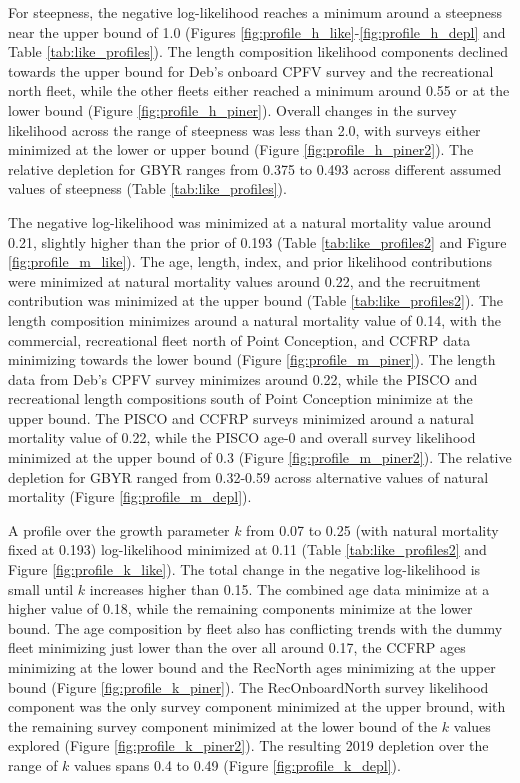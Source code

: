 \documentclass[12pt,]{article}
\begin{document}
For steepness, the negative log-likelihood reaches a minimum around a
steepness near the upper bound of 1.0 (Figures
\ref{fig:profile_h_like}-\ref{fig:profile_h_depl} and Table
\ref{tab:like_profiles}). The length composition likelihood components
declined towards the upper bound for Deb's onboard CPFV survey and the
recreational north fleet, while the other fleets either reached a
minimum around 0.55 or at the lower bound (Figure
\ref{fig:profile_h_piner}). Overall changes in the survey likelihood
across the range of steepness was less than 2.0, with surveys either
minimized at the lower or upper bound (Figure
\ref{fig:profile_h_piner2}). The relative depletion for GBYR ranges from
0.375 to 0.493 across different assumed values of steepness (Table
\ref{tab:like_profiles}).

The negative log-likelihood was minimized at a natural mortality value
around 0.21, slightly higher than the prior of 0.193 (Table
\ref{tab:like_profiles2} and Figure \ref{fig:profile_m_like}). The age,
length, index, and prior likelihood contributions were minimized at
natural mortality values around 0.22, and the recruitment contribution
was minimized at the upper bound (Table \ref{tab:like_profiles2}). The
length composition minimizes around a natural mortality value of 0.14,
with the commercial, recreational fleet north of Point Conception, and
CCFRP data minimizing towards the lower bound (Figure
\ref{fig:profile_m_piner}). The length data from Deb's CPFV survey
minimizes around 0.22, while the PISCO and recreational length
compositions south of Point Conception minimize at the upper bound. The
PISCO and CCFRP surveys minimized around a natural mortality value of
0.22, while the PISCO age-0 and overall survey likelihood minimized at
the upper bound of 0.3 (Figure \ref{fig:profile_m_piner2}). The relative
depletion for GBYR ranged from 0.32-0.59 across alternative values of
natural mortality (Figure \ref{fig:profile_m_depl}).

A profile over the growth parameter \(k\) from 0.07 to 0.25 (with
natural mortality fixed at 0.193) log-likelihood minimized at 0.11
(Table \ref{tab:like_profiles2} and Figure \ref{fig:profile_k_like}).
The total change in the negative log-likelihood is small until \(k\)
increases higher than 0.15. The combined age data minimize at a higher
value of 0.18, while the remaining components minimize at the lower
bound. The age composition by fleet also has conflicting trends with the
dummy fleet minimizing just lower than the over all around 0.17, the
CCFRP ages minimizing at the lower bound and the RecNorth ages
minimizing at the upper bound (Figure \ref{fig:profile_k_piner}). The
RecOnboardNorth survey likelihood component was the only survey
component minimized at the upper bround, with the remaining survey
component minimized at the lower bound of the \(k\) values explored
(Figure \ref{fig:profile_k_piner2}). The resulting 2019 depletion over
the range of \(k\) values spans 0.4 to 0.49 (Figure
\ref{fig:profile_k_depl}).
\end{document}

